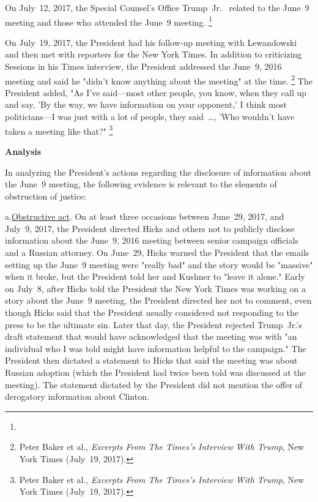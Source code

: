 On July~12, 2017, the Special Counsel's Office  Trump~Jr.\
 related to the June~9 meeting and those who attended the June~9 meeting.%
\footnote{\blackout{Grand Jury}}

On July~19, 2017, the President had his follow-up meeting with Lewandowski and then met with reporters for the New York Times.
In addition to criticizing Sessions in his Times interview, the President addressed the June~9, 2016 meeting and said he "didn't know anything about the meeting" at the time.%
\footnote{Peter Baker et al., \textit{Excerpts From The Times's Interview With Trump}, New York Times (July~19, 2017).}
The President added, "As I've said---most other people, you know, when they call up and say, 'By the way, we have information on your opponent,' I think most politicians---I was just with a lot of people, they said~\dots,
'Who wouldn't have taken a meeting like that?"%
\footnote{Peter Baker et al., \textit{Excerpts From The Times's Interview With Trump}, New York Times (July~19, 2017).}

\begin{center}
\textbf{Analysis}
\end{center}

In analyzing the President's actions regarding the disclosure of information about the June~9 meeting, the following evidence is relevant to the elements of obstruction of justice:

a.\qquad\underline{Obstructive act}.
On at least three occasions between June~29, 2017, and July~9, 2017, the President directed Hicks and others not to publicly disclose information about the June~9, 2016 meeting between senior campaign officials and a Russian attorney.
On June~29, Hicks warned the President that the emails setting up the June~9 meeting were "really bad" and the story would be "massive" when it broke, but the President told her and Kushner to "leave it alone."
Early on July~8, after Hicks told the President the New York Times was working on a story about the June~9 meeting, the President directed her not to comment, even though Hicks said that the President usually considered not responding to the press to be the ultimate sin.
Later that day, the President rejected Trump~Jr.'s draft statement that would have acknowledged that the meeting was with "an individual who I was told might have information helpful to the campaign." The President then dictated a statement to Hicks that said the meeting was about Russian adoption (which the President had twice been told was discussed at the meeting).
The statement dictated by the President did not mention the offer of derogatory information about Clinton.

